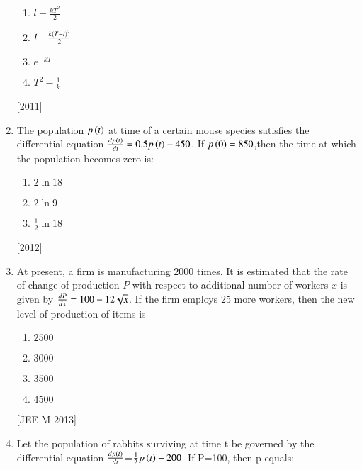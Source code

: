 \documentclass[journal]{IEEEtran}
\begin{document}
\begin{enumerate}
\begin{multicols}{2}
\begin {enumerate}
    \item $ l -\frac{kT^2}{2}$
    \item $ l - \frac{k\left(T-t\right)^2}{2}$
    \item $ e^{-kT}$
    \item $ T^2-\frac{1}{k}$

 \end{enumerate}
\end{multicols}
\hfill
{[2011]}

\item The population $p\left(t\right)$ at time of a certain mouse species satisfies the differential equation $\frac{d{p\left(t\right)}}{d{t}}= 0.5p\left(t\right)- 450$. If $p\left(0\right)=850$,then the time at which the population becomes zero is:
\begin{multicols}{2}
 \begin{enumerate}
    \item $ 2\ln{18}$
    \item $ 2\ln{9}$
    \item $ \frac{1}{2}\ln{18}$
 \end{enumerate}
\end{multicols}
\hfill
{[2012]}

\item At present, a firm is manufacturing $2000$ times. It is estimated that the rate of change of production $P$ with respect to additional number of workers $x$ is given by $\frac{d{P}}{d{x}}=100-12\sqrt{x}$. If the firm employs 25 more workers, then the new level of production of items is

\begin{multicols}{2}
    

 \begin{enumerate}

    \item $2500$
    \item$3000$
    \item$3500$
    \item$4500$
 \end{enumerate}
\end{multicols}

\hfill
{[JEE M 2013]}


\item Let the population of rabbits surviving at time t be governed by the differential equation $\frac{d{p\left(t\right)}}{d{t}}$=$\frac{1}{2}p\left(t\right)-200$. If P=100, then p equals:


\end{enumerate}
\end{document}
